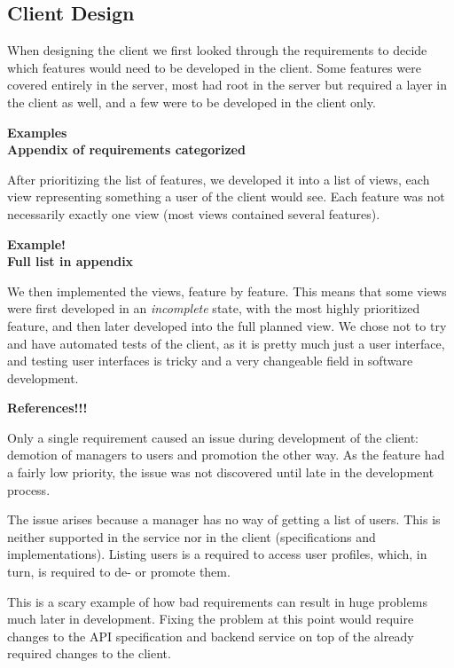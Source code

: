 \subsection{Client Design}

When designing the client we first looked through the requirements to decide
which features would need to be developed in the client. Some features were
covered entirely in the server, most had root in the server but required a
layer in the client as well, and a few were to be developed in the client
only.

\textbf{Examples\\Appendix of requirements categorized}

After prioritizing the list of features, we developed it into a list of views,
each view representing something a user of the client would see. Each feature
was not necessarily exactly one view (most views contained several features).

\textbf{Example!\\Full list in appendix}

We then implemented the views, feature by feature. This means that some views
were first developed in an \emph{incomplete} state, with the most highly
prioritized feature, and then later developed into the full planned view. We
chose not to try and have automated tests of the client, as it is pretty much
just a user interface, and testing user interfaces is tricky and a very
changeable field in software development.

\textbf{References!!!}

Only a single requirement caused an issue during development of the client:
demotion of managers to users and promotion the other way. As the feature
had a fairly low priority, the issue was not discovered until late in the
development process.

The issue arises because a manager has no way of getting a list of users. This
is neither supported in the service nor in the client (specifications and
implementations). Listing users is a required to access user profiles, which, in
turn, is required to de- or promote them.

This is a scary example of how bad requirements can result in huge problems much
later in development. Fixing the problem at this point would require changes to
the API specification and backend service on top of the already required changes
to the client.

